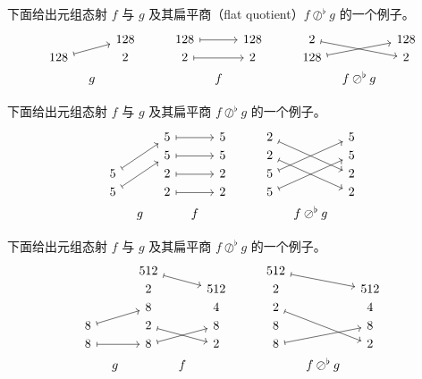\begin{example}
下面给出元组态射 $f$ 与 $g$ 及其扁平商（flat quotient）$f \oslash^\flat g$ 的一个例子。
    \[ \begin{tikzcd} [row sep = 1, column sep = 8]
     & & 128& & & 128 \ar[rr,mapsto] & & 128 & & & 2 \ar[drr,mapsto] & & 128\\
    128 \ar[rru,mapsto] & & 2 & & &  2 \ar[rr,mapsto] & & 2 & & & 128 \ar[urr,mapsto] & & 2\\
    & g & & & & & f & & & & & f \oslash^\flat g & 
    \end{tikzcd} \]
\end{example}

\begin{example}
    下面给出元组态射 $f$ 与 $g$ 及其扁平商 $f \oslash^\flat g$ 的一个例子。
    \[ \begin{tikzcd} [row sep = 1, column sep = 8]
     & &  5 \ar[rr,mapsto] & & 5 & & & 2 \ar[ddrr,mapsto] & & 5\\
     & &  5 \ar[rr,mapsto] & & 5 & & & 2 \ar[ddrr,mapsto] & & 5\\
    5 \ar[uurr,mapsto] & &  2 \ar[rr,mapsto] & & 2 & & & 5 \ar[uurr,mapsto] & & 2\\
    5 \ar[uurr,mapsto] & &  2 \ar[rr,mapsto] & & 2 & & & 5 \ar[uurr,mapsto] & & 2\\
    & g & & f & & & & & f\oslash^\flat g & 
    \end{tikzcd} \]
\end{example}

\begin{example}
   下面给出元组态射 $f$ 与 $g$ 及其扁平商 $f \oslash^\flat g$ 的一个例子。
    \[ \begin{tikzcd} [row sep = 1, column sep = 8]
    & & 512 \ar[drr,mapsto] & & & & & 512 \ar[drr,mapsto] & & \\
     & & 2 & & 512 & & & 2 & & 512\\
     & & 8  & & 4 & & & 2 \ar[ddrr,mapsto] & & 4\\
    8 \ar[urr,mapsto] & & 2  \ar[drr,mapsto]  & & 8 & & & 8 & & 8\\
    8 \ar[rr,mapsto] & & 8 \ar[urr,mapsto] & &  2 & & & 8 \ar[urr,mapsto]  & & 2\\
    & g & & f & & & &  & f \oslash^\flat g & 
    \end{tikzcd} \]
\end{example}



